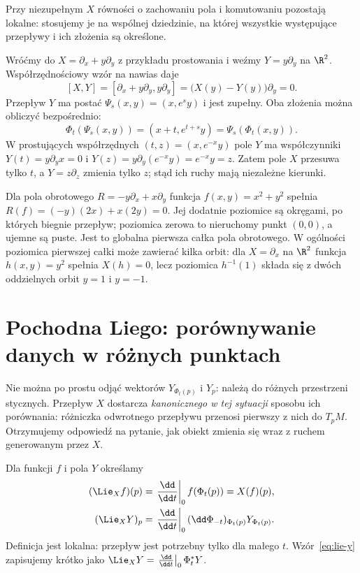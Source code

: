 Przy niezupełnym $X$ równości o zachowaniu pola i komutowaniu
pozostają lokalne: stosujemy je na wspólnej dziedzinie, na której
wszystkie występujące przepływy i ich złożenia są określone.

\begin{przyklad}
Wróćmy do $X=\partial_x+y\partial_y$ z przykładu prostowania
i weźmy $Y=y\partial_y$ na $\R^2$.
Współrzędnościowy wzór na nawias daje
\[
[X,Y]=[\partial_x+y\partial_y,y\partial_y]
=\bigl(X(y)-Y(y)\bigr)\partial_y=0.
\]
Przepływ $Y$ ma postać $\Psi_s(x,y)=(x,e^s y)$ i jest zupełny.
Oba złożenia można obliczyć bezpośrednio:
\[
\Phi_t(\Psi_s(x,y))=(x+t,e^{t+s}y)
=\Psi_s(\Phi_t(x,y)).
\]
W prostujących współrzędnych $(t,z)=(x,e^{-x}y)$
pole $Y$ ma współczynniki $Y(t)=y\partial_yx=0$
i $Y(z)=y\partial_y(e^{-x}y)=e^{-x}y=z$.
Zatem pole $X$ przesuwa tylko $t$, a $Y=z\partial_z$ zmienia
tylko $z$; stąd ich ruchy mają niezależne kierunki.
\end{przyklad}

\begin{przyklad}
Dla pola obrotowego $R=-y\partial_x+x\partial_y$
funkcja $f(x,y)=x^2+y^2$ spełnia
$R(f)=(-y)(2x)+x(2y)=0$.
Jej dodatnie poziomice są okręgami, po których biegnie przepływ;
poziomica zerowa to nieruchomy punkt $(0,0)$, a ujemne są puste.
Jest to globalna pierwsza całka pola obrotowego.
W ogólności poziomica pierwszej całki może zawierać kilka orbit:
dla $X=\partial_x$ na $\R^2$ funkcja $h(x,y)=y^2$ spełnia
$X(h)=0$, lecz poziomica $h^{-1}(1)$ składa się z dwóch
oddzielnych orbit $y=1$ i $y=-1$.
\end{przyklad}

\section{Pochodna Liego: porównywanie danych w różnych punktach}
\label{sec:liego}

Nie można po prostu odjąć wektorów $Y_{\Phi_t(p)}$ i $Y_p$:
należą do różnych przestrzeni stycznych. Przepływ $X$ dostarcza
\emph{kanonicznego w tej sytuacji} sposobu ich porównania:
różniczka odwrotnego przepływu przenosi pierwszy z nich do $T_pM$.
Otrzymujemy odpowiedź na pytanie, jak obiekt zmienia się
wraz z ruchem generowanym przez $X$.

\begin{definicja}\label{def:pochodna-liego}
Dla funkcji $f$ i pola $Y$ określamy
\begin{align}
 (\Lie_Xf)(p)
 &=\left.\frac{\dd}{\dd t}\right|_{0}f(\Phi_t(p))=X(f)(p),
 \label{eq:lie-f}\\
 (\Lie_XY)_p
 &=\left.\frac{\dd}{\dd t}\right|_{0}
 (\dd\Phi_{-t})_{\Phi_t(p)}Y_{\Phi_t(p)}.
 \label{eq:lie-y}
\end{align}
Definicja jest lokalna: przepływ jest potrzebny tylko dla małego $t$.
Wzór~\eqref{eq:lie-y} zapisujemy krótko jako
$\Lie_XY=\left.\frac{\dd}{\dd t}\right|_0\Phi_t^*Y$.
\end{definicja}


